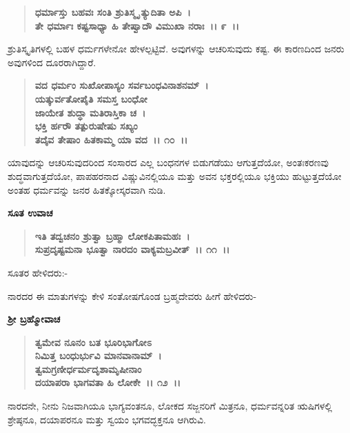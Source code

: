 \begin{verse}
\textbf{ಧರ್ಮಾಸ್ತು ಬಹವಃ ಸಂತಿ ಶ್ರುತಿಸ್ಮೃ ತ್ಯುದಿತಾ ಅಪಿ~।}\\\textbf{ತೇ ಧರ್ಮಾಃ ಕಷ್ಟಸಾಧ್ಯಾ ಹಿ ತೇಷ್ವಾದೌ ವಿಮುಖಾ ನರಾಃ~।। ೯~।।}
\end{verse}

ಶ್ರುತಿಸ್ಕೃತಿಗಳಲ್ಲಿ ಬಹಳ ಧರ್ಮಗಳೇನೋ ಹೇಳಲ್ಪಟ್ಟಿವೆ. ಅವುಗಳನ್ನು ಆಚರಿಸುವುದು ಕಷ್ಟ. ಈ ಕಾರಣದಿಂದ ಜನರು ಅವುಗಳಿಂದ ದೂರರಾಗಿದ್ದಾರೆ.

\begin{verse}
\textbf{ವದ ಧರ್ಮಂ ಸುಖೋಪಾಸ್ಯಂ ಸರ್ವಬಂಧವಿನಾಶನಮ್~।}\\\textbf{ಯತ್ಕುರ್ವತೋಪೈತಿ ಸಮಸ್ತ ಬಂಧೋ }\\\textbf{ಜಾಯೇತ ಶುದ್ಧಾ ಮತಿರಾಸ್ತಿಕಾ ಚ~।}\\\textbf{ಭಕ್ತಿ ರ್ಹರೌ ತತ್ಪುರುಷೇಷು ಸಖ್ಯಂ }\\\textbf{ತದೈವ ತೇಷಾಂ ಹಿತಕಾಮ್ಮ ಯಾ ವದ~।। ೧೦~।।}
\end{verse}

ಯಾವುದನ್ನು ಆಚರಿಸುವುದರಿಂದ ಸಂಸಾರದ ಎಲ್ಲ ಬಂಧನಗಳ ಬಿಡುಗಡೆಯು ಆಗುತ್ತದೆಯೋ, ಅಂತಃಕರಣವು ಶುದ್ಧವಾಗುತ್ತದೆಯೋ, ಪಾಪಹರನಾದ ವಿಷ್ಣುವಿನಲ್ಲಿಯೂ ಮತ್ತು ಅವನ ಭಕ್ತರಲ್ಲಿಯೂ ಭಕ್ತಿಯು ಹುಟ್ಟುತ್ತದೆಯೋ ಅಂತಹ ಧರ್ಮವನ್ನು ಜನರ ಹಿತಕ್ಕೋಸ್ಕರವಾಗಿ ನುಡಿ.

\begin{flushleft}
\textbf{ಸೂತ ಉವಾಚ\enginline{-}}
\end{flushleft}

\begin{verse}
\textbf{ಇತಿ ತದ್ವಚನಂ ಶ್ರುತ್ವಾ ಬ್ರಹ್ಮಾ ಲೋಕಪಿತಾಮಹಃ~।}\\\textbf{ಸುಪ್ರದೃಷ್ಟಮನಾ ಭೂತ್ವಾ ನಾರದಂ ವಾಕ್ಯಮಬ್ರವೀತ್~।। ೧೧~।।}
\end{verse}

\noindent
ಸೂತರ ಹೇಳಿದರು:-

ನಾರದರ ಈ ಮಾತುಗಳನ್ನು ಕೇಳಿ ಸಂತೋಷಗೊಂಡ ಬ್ರಹ್ಮದೇವರು ಹೀಗೆ ಹೇಳಿದರು-

\begin{flushleft}
\textbf{ಶ‍್ರೀ ಬ್ರಹ್ಮೋವಾಚ\enginline{-}}
\end{flushleft}

\begin{verse}
\textbf{ತ್ವಮೇವ ನೂನಂ ಬತ ಭೂರಿಭಾಗೋಽ}\\\textbf{ನಿಮಿತ್ತ ಬಂಧುರ್ಭುವಿ ಮಾನವಾನಾಮ್~।}\\\textbf{ತ್ವಮಗ್ರಣೀರ್ಧರ್ಮದೃಶಾಮೃಷೀನಾಂ } \\\textbf{ದಯಾಪರಾ ಭಾಗವತಾ ಹಿ ಲೋಕೇ~।। ೧೨~।।}
\end{verse}

ನಾರದನೇ, ನೀನು ನಿಜವಾಗಿಯೂ ಭಾಗ್ಯವಂತನೂ, ಲೋಕದ ಸಜ್ಜನರಿಗೆ ಮಿತ್ರನೂ, ಧರ್ಮವನ್ನರಿತ ಋಷಿಗಳಲ್ಲಿ ಶ್ರೇಷ್ಠನೂ, ದಯಾಪರನೂ ಮತ್ತು ಸ್ವಯಂ ಭಗವದ್ಭಕ್ತನೂ ಆಗಿರುವಿ.

